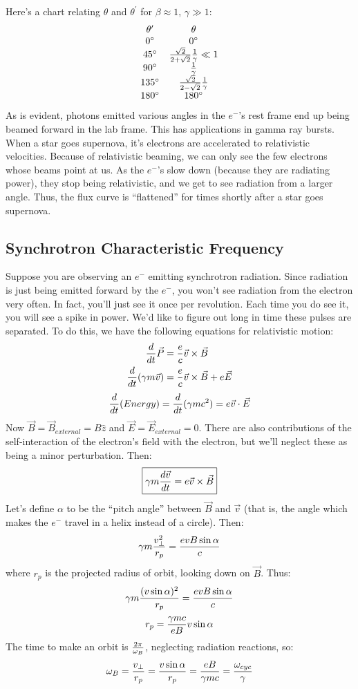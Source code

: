 \documentclass[11pt]{article}
\def\^{\hat}
\def\inv#1{{1 \over #1}}
\def\ddt{{d \over dt}}
\begin{document}
Here's a chart relating $\theta$ and $\theta^\prime$ for $\beta\approx1$,
$\gamma\gg1$:
$$\begin{matrix}
\theta^\prime&\theta\\
0^\circ&0^\circ\\
45^\circ&{\sqrt{2}\over2+\sqrt{2}}{1\over\gamma}\ll1\\
90^\circ&\inv{\gamma}\\
135^\circ&{\sqrt{2}\over2-\sqrt{2}}\inv{\gamma}\\
180^\circ&180^\circ\\
\end{matrix}$$
As is evident, photons emitted various angles in the $e^-$'s rest frame
end up being beamed forward in the lab frame.
This has applications in gamma ray bursts.  When a star goes supernova, 
it's electrons are accelerated to relativistic velocities.  Because of
relativistic beaming, we can only see the few electrons whose beams
point at us.  As the $e^-$'s slow down (because they are radiating power),
they stop being relativistic, and we get to see radiation from a larger
angle.  Thus, the flux curve is ``flattened'' for times shortly after
a star goes supernova.

\subsection*{ Synchrotron Characteristic Frequency}

Suppose you are observing an $e^-$ emitting synchrotron radiation.  Since
radiation is just being emitted forward by the $e^-$, you won't see radiation
from the electron very often.  In fact, you'll just see it once per revolution.
Each time you do see it, you will see a spike in power.  We'd like to figure
out long in time these pulses are separated.  To do this, we have the 
following equations for relativistic motion:
$$\begin{aligned}\ddt\vec P&={e\over c}\vec v\times\vec B\\ 
\ddt(\gamma m\vec v)&={e\over c}\vec v\times\vec B+e\vec E\\ \end{aligned}$$
$$\ddt(Energy)=\ddt(\gamma mc^2)=e\vec v\cdot\vec E$$
Now $\vec B=\vec B_{external}=B\^z$ and $\vec E=\vec E_{external}=0$.  There
are also contributions of the self-interaction of the electron's field with
the electron, but we'll neglect these as being a minor perturbation.  Then:
$$\boxed{\gamma m{d\vec v\over dt}=e\vec v\times\vec B}$$
Let's define $\alpha$ to be the ``pitch angle'' between $\vec B$ and $\vec v$
(that is, the angle which makes the $e^-$ travel in a helix instead of a 
circle).
Then:
$$\gamma m{v_\perp^2\over r_p}={evB\sin\alpha\over c}$$
where $r_p$ is the projected radius of orbit, looking down on $\vec B$. Thus:
$$\gamma m{(v\sin\alpha)^2\over r_p}={evB\sin\alpha\over c}$$
$$r_p={\gamma mc\over eB}v\sin\alpha$$
The time to make an orbit is ${2\pi\over\omega_B}$, neglecting radiation
reactions, so:
$$\omega_B={v_\perp\over r_p}={v\sin\alpha\over r_p}={eB\over\gamma mc}
={\omega_{cyc}\over\gamma}$$
\end{document}
